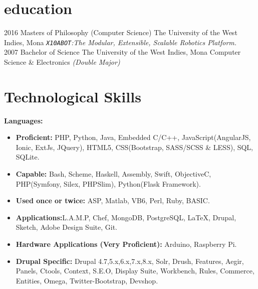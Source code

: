 \documentclass[]{friggeri-cv} %
\begin{document}
\section{education}

\begin{entrylist}
\entry
{2016}
{Masters {\normalfont of Philosophy (Computer Science)}}
{The University of the West Indies, Mona}
{\emph{\texttt{X10ABOT}:The Modular, Extensible, Scalable Robotics Platform.}} \\
\entry
{2007}
{Bachelor {\normalfont of Science}}
{The University of the West Indies, Mona}
{Computer Science \& Electronics \emph{(Double Major)}}
\end{entrylist}


\section{Technological Skills}
\textbf{Languages:}
\begin{itemize}
\item \textbf{Proficient: }PHP, Python, Java, Embedded C/C++, JavaScript(AngularJS, Ionic, ExtJs, JQuery), HTML5, CSS(Bootstrap, SASS/SCSS \& LESS), SQL, SQLite.
\item \textbf{Capable: }Bash, Scheme, Haskell, Assembly, Swift, Objective\-C, PHP(Symfony, Silex, PHPSlim), Python(Flask Framework).
\item \textbf{Used once or twice: }ASP, Matlab, VB6, Perl, Ruby, BASIC.
\item \textbf{Applications:}L.A.M.P, Chef, MongoDB, PostgreSQL, \LaTeX, Drupal, Sketch, Adobe Design Suite, Git.
\item \textbf{Hardware Applications (Very Proficient):} Arduino, Raspberry Pi.
\item \textbf{Drupal Specific: } Drupal 4.7,5.x,6.x,7.x,8.x, Solr, Drush, Features, Aegir, Panels, Ctools, Context, S.E.O, Display Suite, Workbench, Rules, Commerce, Entities, Omega, Twitter-Bootstrap, Devshop.
\end{itemize}
\end{document}
